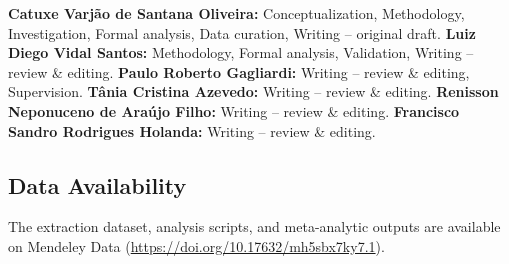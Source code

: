 \documentclass[12pt,a4paper]{article}
\begin{document}
\textbf{Catuxe Varj\~ao de Santana Oliveira:} Conceptualization, Methodology, Investigation, Formal analysis, Data curation, Writing -- original draft.
\textbf{Luiz Diego Vidal Santos:} Methodology, Formal analysis, Validation, Writing -- review \& editing.
\textbf{Paulo Roberto Gagliardi:} Writing -- review \& editing, Supervision.
\textbf{T\^ania Cristina Azevedo:} Writing -- review \& editing.
\textbf{Renisson Neponuceno de Ara\'ujo Filho:} Writing -- review \& editing.
\textbf{Francisco Sandro Rodrigues Holanda:} Writing -- review \& editing.

\subsection*{Data Availability}

The extraction dataset, analysis scripts, and meta-analytic outputs are available on Mendeley Data (\url{https://doi.org/10.17632/mh5sbx7ky7.1}).
\end{document}
